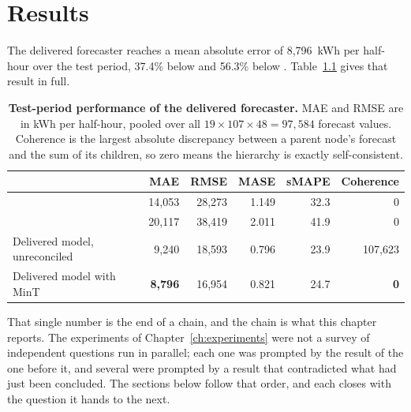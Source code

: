 \chapter{Results}
\label{ch:results}

The delivered forecaster reaches a mean absolute error of 8,796~kWh per half-hour over the
test period, 37.4\% below \naiveA{} and 56.3\% below \naiveB{}.
Table~\ref{tab:headline} gives that result in full.

\begin{table}[htp]
\centering
\begin{tabular}{lrrrrr}
\toprule
& {\bf MAE} & {\bf RMSE} & {\bf MASE} & {\bf sMAPE} & {\bf Coherence} \\
\midrule
\naiveA{} & 14,053 & 28,273 & 1.149 & 32.3 & 0 \\
\naiveB{} & 20,117 & 38,419 & 2.011 & 41.9 & 0 \\
Delivered model, unreconciled & 9,240 & 18,593 & 0.796 & 23.9 & 107,623 \\
Delivered model with MinT & {\bf 8,796} & 16,954 & 0.821 & 24.7 & {\bf 0} \\
\bottomrule
\end{tabular}
\caption[Headline test-period result]{\textbf{Test-period performance of the delivered
forecaster.} MAE and RMSE are in kWh per half-hour, pooled over all
$19 \times 107 \times 48 = 97{,}584$ forecast values. Coherence is the largest absolute
discrepancy between a parent node's forecast and the sum of its children, so zero means
the hierarchy is exactly self-consistent.}
\label{tab:headline}
\end{table}

That single number is the end of a chain, and the chain is what this chapter reports. The
experiments of Chapter~\ref{ch:experiments} were not a survey of independent questions run
in parallel; each one was prompted by the result of the one before it, and several were
prompted by a result that contradicted what had just been concluded. The sections below
follow that order, and each closes with the question it hands to the next.

